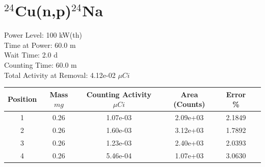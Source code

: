 \newpage

\section*{ $^{24}$Cu(n,p)$^{24}$Na }

Power Level: 100 kW(th) \\
Time at Power: 60.0 m \\
Wait Time:  2.0 d \\
Counting Time: 60.0 m \\
Total Activity at Removal: 4.12e-02 $\mu Ci$

\begin{table}[h]
\centering
\begin{tabular}{ |c|c|c|c|c|c| }
 \hline
 Position & Mass $mg$ & Counting Activity $\mu Ci$ & Area (Counts) & Error \% \\
 \hline 
 1 & 0.26 & 1.07e-03 & 2.09e+03 & 2.1849 \\ 
\hline
 2 & 0.26 & 1.60e-03 & 3.12e+03 & 1.7892 \\ 
\hline
 3 & 0.26 & 1.23e-03 & 2.40e+03 & 2.0393 \\ 
\hline
 4 & 0.26 & 5.46e-04 & 1.07e+03 & 3.0630 \\ 
\hline
\end{tabular}
\end{table}


